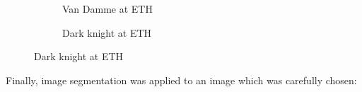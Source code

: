 \documentclass[paper=a4, fontsize=11pt]{scrartcl} %
\numberwithin{equation}{section} %
\numberwithin{figure}{section} %
\numberwithin{table}{section} %
\begin{document}
\begin{figure}[H]
	\caption{Background change with $\lambda = 1$\label{fig:simple}}
	\centering
	\begin{subfigure}[b]{0.45\textwidth}
		\noindent{}
	\caption{Van Damme at ETH}
	\end{subfigure}
	\begin{subfigure}[b]{0.45\textwidth}
		\noindent{}
	\caption{Dark knight at ETH}
	\end{subfigure}
\end{figure}

\pagebreak

Finally, image segmentation was applied to an image which was carefully chosen:
\end{document}
